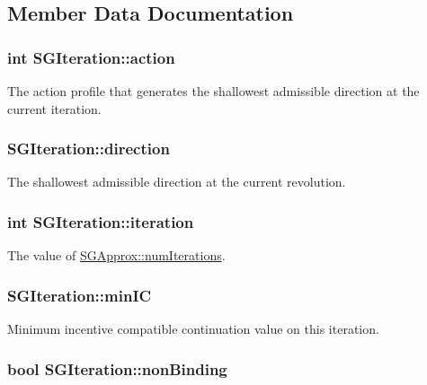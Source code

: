 \subsection{Member Data Documentation}
\hypertarget{classSGIteration_a554a41e3b428d0d05a1aec04b612cf3f}{
\subsubsection[{action}]{\setlength{\rightskip}{0pt plus 5cm}int S\-G\-Iteration\-::action}}\label{classSGIteration_a554a41e3b428d0d05a1aec04b612cf3f}
The action profile that generates the shallowest admissible direction at the current iteration. \hypertarget{classSGIteration_ac35e7e3049cd60c695a366cb8f75db37}{
\subsubsection[{direction}]{ S\-G\-Iteration\-::direction}}\label{classSGIteration_ac35e7e3049cd60c695a366cb8f75db37}
The shallowest admissible direction at the current revolution. \hypertarget{classSGIteration_a44a4f9e3cb074181292ae816b2c28d9e}{
\subsubsection[{iteration}]{\setlength{\rightskip}{0pt plus 5cm}int S\-G\-Iteration\-::iteration}}\label{classSGIteration_a44a4f9e3cb074181292ae816b2c28d9e}
The value of \hyperlink{classSGApprox_a7ab53424f5933726a15001ff2885a4a9}{S\-G\-Approx\-::num\-Iterations}. \hypertarget{classSGIteration_aa0deb29f2225a51bafa3dacc730fdb64}{
\subsubsection[{min\-I\-C}]{ S\-G\-Iteration\-::min\-I\-C}}\label{classSGIteration_aa0deb29f2225a51bafa3dacc730fdb64}
Minimum incentive compatible continuation value on this iteration. \hypertarget{classSGIteration_a7520e6ea4903e8b32884294a3c65b331}{
\subsubsection[{non\-Binding}]{\setlength{\rightskip}{0pt plus 5cm}bool S\-G\-Iteration\-::non\-Binding}}\label{classSGIteration_a7520e6ea4903e8b32884294a3c65b331}
